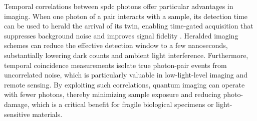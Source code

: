 Temporal correlations between \acrshort{spdc} photons offer particular advantages in imaging. When one photon of a pair interacts with a sample, its detection time can be used to herald the arrival of its twin, enabling time-gated acquisition that suppresses background noise and improves signal fidelity \cite{moreauImagingQuantumStates2019}. Heralded imaging schemes can reduce the effective detection window to a few nanoseconds, substantially lowering dark counts and ambient light interference. Furthermore, temporal coincidence measurements isolate true photon-pair events from uncorrelated noise, which is particularly valuable in low-light-level imaging and remote sensing. By exploiting such correlations, quantum imaging can operate with fewer photons, thereby minimizing sample exposure and reducing photo-damage, which is a critical benefit for fragile biological specimens or light-sensitive materials.






